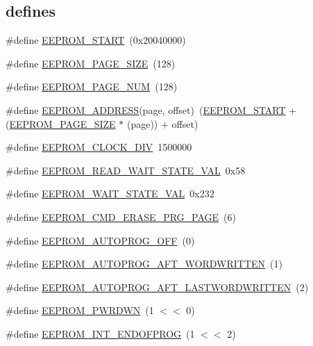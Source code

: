 \subsection*{\textquotesingle{}defines\textquotesingle{}}
\begin{DoxyCompactItemize}
\item 
\#define \hyperlink{group___e_e_p_r_o_m__18_x_x__43_x_x_ga19220ff77b3f420a71eddcfcb2534a52}{E\+E\+P\+R\+O\+M\+\_\+\+S\+T\+A\+RT}~(0x20040000)
\item 
\#define \hyperlink{group___e_e_p_r_o_m__18_x_x__43_x_x_gaddfda15f5f3ec6f8f325f48be50c548a}{E\+E\+P\+R\+O\+M\+\_\+\+P\+A\+G\+E\+\_\+\+S\+I\+ZE}~(128)
\item 
\#define \hyperlink{group___e_e_p_r_o_m__18_x_x__43_x_x_gafb110eded8c7e52bf0826c2bedfd90cd}{E\+E\+P\+R\+O\+M\+\_\+\+P\+A\+G\+E\+\_\+\+N\+UM}~(128)
\item 
\#define \hyperlink{group___e_e_p_r_o_m__18_x_x__43_x_x_ga7ee5cba0bfcfb004dfba1245a977c216}{E\+E\+P\+R\+O\+M\+\_\+\+A\+D\+D\+R\+E\+SS}(page,  offset)~(\hyperlink{group___e_e_p_r_o_m__18_x_x__43_x_x_ga19220ff77b3f420a71eddcfcb2534a52}{E\+E\+P\+R\+O\+M\+\_\+\+S\+T\+A\+RT} + (\hyperlink{group___e_e_p_r_o_m__18_x_x__43_x_x_gaddfda15f5f3ec6f8f325f48be50c548a}{E\+E\+P\+R\+O\+M\+\_\+\+P\+A\+G\+E\+\_\+\+S\+I\+ZE} $\ast$ (page)) + offset)
\item 
\#define \hyperlink{group___e_e_p_r_o_m__18_x_x__43_x_x_gad60e60fac4934de0ea5ad45fc6035fbc}{E\+E\+P\+R\+O\+M\+\_\+\+C\+L\+O\+C\+K\+\_\+\+D\+IV}~1500000
\item 
\#define \hyperlink{group___e_e_p_r_o_m__18_x_x__43_x_x_gae7c4f0b2db03d7cd7a036158e88346b8}{E\+E\+P\+R\+O\+M\+\_\+\+R\+E\+A\+D\+\_\+\+W\+A\+I\+T\+\_\+\+S\+T\+A\+T\+E\+\_\+\+V\+AL}~0x58
\item 
\#define \hyperlink{group___e_e_p_r_o_m__18_x_x__43_x_x_ga33a1933987e17e85216abe94ff29e4d3}{E\+E\+P\+R\+O\+M\+\_\+\+W\+A\+I\+T\+\_\+\+S\+T\+A\+T\+E\+\_\+\+V\+AL}~0x232
\item 
\#define \hyperlink{group___e_e_p_r_o_m__18_x_x__43_x_x_ga6d6a26f6d387d9bc636c56c07994f0b6}{E\+E\+P\+R\+O\+M\+\_\+\+C\+M\+D\+\_\+\+E\+R\+A\+S\+E\+\_\+\+P\+R\+G\+\_\+\+P\+A\+GE}~(6)
\item 
\#define \hyperlink{group___e_e_p_r_o_m__18_x_x__43_x_x_ga3b420badc39c2adf9780d44a74faa45a}{E\+E\+P\+R\+O\+M\+\_\+\+A\+U\+T\+O\+P\+R\+O\+G\+\_\+\+O\+FF}~(0)
\item 
\#define \hyperlink{group___e_e_p_r_o_m__18_x_x__43_x_x_ga707dd1e49eb23a4e804d58d2d19bba52}{E\+E\+P\+R\+O\+M\+\_\+\+A\+U\+T\+O\+P\+R\+O\+G\+\_\+\+A\+F\+T\+\_\+W\+O\+R\+D\+W\+R\+I\+T\+T\+EN}~(1)
\item 
\#define \hyperlink{group___e_e_p_r_o_m__18_x_x__43_x_x_ga6c353fc9ef8b0be089c548ccd58c6388}{E\+E\+P\+R\+O\+M\+\_\+\+A\+U\+T\+O\+P\+R\+O\+G\+\_\+\+A\+F\+T\+\_\+\+L\+A\+S\+T\+W\+O\+R\+D\+W\+R\+I\+T\+T\+EN}~(2)
\item 
\#define \hyperlink{group___e_e_p_r_o_m__18_x_x__43_x_x_ga71f23d0464d767653aad1e73d30a14dc}{E\+E\+P\+R\+O\+M\+\_\+\+P\+W\+R\+D\+WN}~(1 $<$$<$ 0)
\item 
\#define \hyperlink{group___e_e_p_r_o_m__18_x_x__43_x_x_ga6cbd8a7a267a151c2d6d324d2bac4eea}{E\+E\+P\+R\+O\+M\+\_\+\+I\+N\+T\+\_\+\+E\+N\+D\+O\+F\+P\+R\+OG}~(1 $<$$<$ 2)
\end{DoxyCompactItemize}
